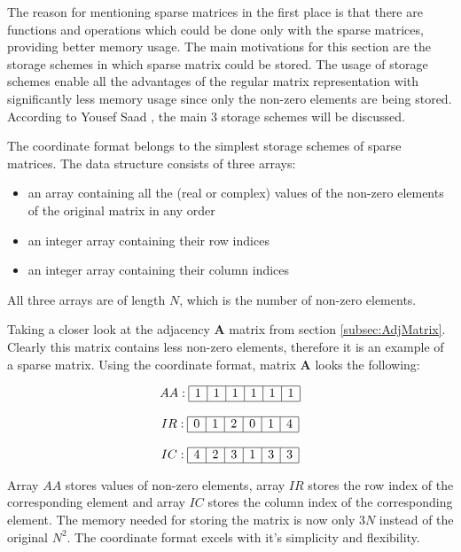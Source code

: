 \documentclass[thesis=M,english]{FITthesis}[2012/10/20]
\begin{document}
The reason for mentioning sparse matrices in the first place is that there are functions and operations which could be done only with the sparse matrices, providing better memory usage. The main motivations for this section are the storage schemes in which sparse matrix could be stored. The usage of storage schemes enable all the advantages of the regular matrix representation with significantly less memory usage since only the non-zero elements are being stored. According to Yousef Saad \cite{Saad03}, the main 3 storage schemes will be discussed. 

The coordinate format belongs to the simplest storage schemes of sparse matrices. The data structure consists of three arrays: 
\begin{itemize}
\item an array containing all the (real or complex) values of the non-zero elements of the original matrix in any order
\item an integer array containing their row indices 
\item an integer array containing their column indices
\end{itemize}
All three arrays are of length $N$, which is the number of non-zero elements.

Taking a closer look at the adjacency $\textbf{A}$ matrix from section \ref{subsec:AdjMatrix}. Clearly this matrix contains less non-zero elements, therefore it is an example of a sparse matrix. Using the coordinate format, matrix $\textbf{A}$ looks the following:

$$
\begin{array}{c}

AA:
\begin{array}{|c|c|c|c|c|c|}
 \hline
 1 & 1 & 1 & 1 & 1 & 1 \\
 \hline
\end{array}
\\ \\
IR:
\begin{array}{|c|c|c|c|c|c|}
 \hline
 0 & 1 & 2 & 0 & 1 & 4 \\
 \hline
\end{array}
\\ \\
IC:
\begin{array}{|c|c|c|c|c|c|}
 \hline
 4 & 2 & 3 & 1 & 3 & 3 \\
 \hline
\end{array}
\end{array}
$$

Array $AA$ stores values of non-zero elements, array $IR$ stores the row index of the corresponding element and array $IC$ stores the column index of the corresponding element. The memory needed for storing the matrix is now only $3N$ instead of the original $N^2$.  The coordinate format excels with it's simplicity and flexibility.
\end{document}
